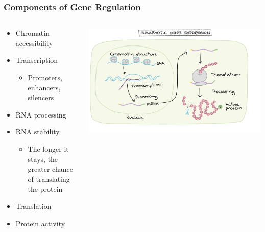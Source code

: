 \documentclass{beamer}
\begin{document}
\begin{frame}
	\frametitle{Components of Gene Regulation}
	\begin{columns}
		
		\begin{column}{0.5\textwidth}
			\scriptsize
			\begin{itemize}
				
				\item[] Chromatin accessibility
				\item[] Transcription
				\begin{itemize}
					\item[] Promoters, enhancers, silencers
				\end{itemize}
				\item[] RNA processing
				\item[] RNA stability
				\begin{itemize}
					\item[] The longer it stays, the greater chance of translating the protein
				\end{itemize}
				\item[] Translation
				\item[] Protein activity
			\end{itemize}
		\end{column}
		\begin{column}{0.5\textwidth}
			\centering	\includegraphics[keepaspectratio, width  = \textwidth]{img/geneExpressionCartoon}
		\end{column}
	\end{columns}	
	
\end{frame}
\end{document}
